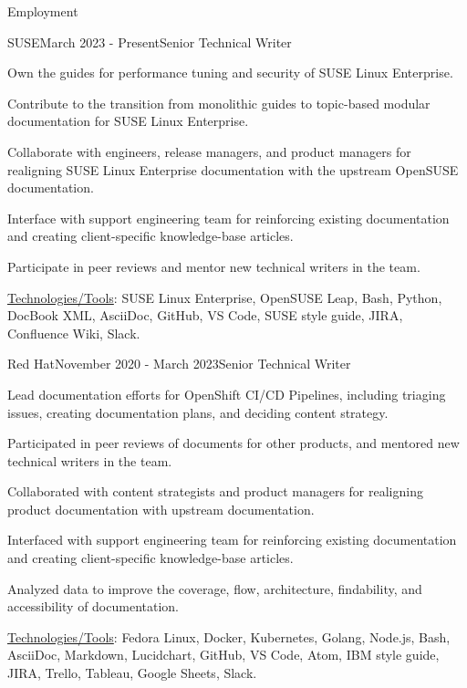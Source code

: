 \documentclass{resume} %
\begin{document}
\begin{rSection}{Employment}

\begin{rSubsection}{SUSE}{March 2023 - Present}{Senior Technical Writer}{}
\item Own the guides for performance tuning and security of SUSE Linux Enterprise.
\item Contribute to the transition from monolithic guides to topic-based modular documentation for SUSE Linux Enterprise.
\item Collaborate with engineers, release managers, and product managers for realigning SUSE Linux Enterprise documentation with the upstream OpenSUSE documentation.
\item Interface with support engineering team for reinforcing existing documentation and creating client-specific knowledge-base articles.
\item Participate in peer reviews and mentor new technical writers in the team. 
\item \underline{Technologies/Tools}: SUSE Linux Enterprise, OpenSUSE Leap, Bash, Python, DocBook XML, AsciiDoc, GitHub, VS Code, SUSE style guide, JIRA, Confluence Wiki, Slack. 
\end{rSubsection}

\begin{rSubsection}{Red Hat}{November 2020 - March 2023}{Senior Technical Writer}{}
\item Lead documentation efforts for OpenShift CI/CD Pipelines, including triaging issues, creating documentation plans, and deciding content strategy.
\item Participated in peer reviews of documents for other products, and mentored new technical writers in the team. 
\item Collaborated with content strategists and product managers for realigning product documentation with upstream documentation.
\item Interfaced with support engineering team for reinforcing existing documentation and creating client-specific knowledge-base articles.
\item Analyzed data to improve the coverage, flow, architecture, findability, and accessibility of documentation. 
\item \underline{Technologies/Tools}: Fedora Linux, Docker, Kubernetes, Golang, Node.js, Bash, AsciiDoc, Markdown, Lucidchart, GitHub, VS Code, Atom, IBM style guide, JIRA, Trello, Tableau, Google Sheets, Slack. 
\end{rSubsection}


\end{rSection}
\end{document}
